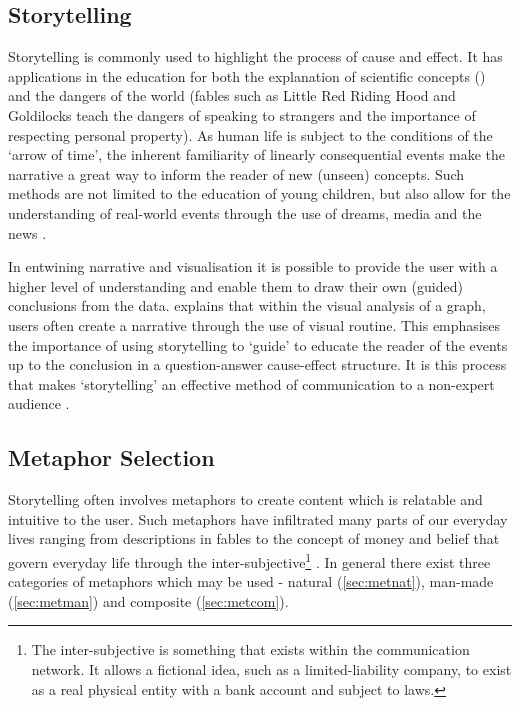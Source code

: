 %



\subsection{Storytelling}\label{sec:storytelling}

Storytelling is commonly used to highlight the process of cause and effect. It has applications in the education for both the explanation of scientific concepts (\citep{marsstory}) and the dangers of the world (fables such as Little Red Riding Hood and Goldilocks teach the dangers of speaking to strangers and the importance of respecting personal property). As human life is subject to the conditions of the `arrow of time', the inherent familiarity of linearly consequential events make the narrative a great way to inform the reader of new (unseen) concepts. Such methods are not limited to the education of young children, but also allow for the understanding of real-world events through the use of dreams, media and the news \citep{storyanimal,dream}.

In entwining narrative and visualisation it is possible to provide the user with a higher level of understanding and enable them to draw their own (guided) conclusions from the data. \cite{eyestory} explains that within the visual analysis of a graph, users often create a narrative through the use of visual routine. This emphasises the importance of using storytelling to `guide' to educate the reader of the events up to the conclusion in a question-answer cause-effect structure. It is this process that makes `storytelling' an effective method of communication to a non-expert audience \citep{nonscientific}.


\subsection{Metaphor Selection}\label{sec:metaphor}
Storytelling often involves metaphors to create content which is relatable and intuitive to the user. Such metaphors have infiltrated many parts of our everyday lives ranging from descriptions in fables to the concept of money and belief that govern everyday life through the inter-subjective\footnote{The inter-subjective is something that exists within the communication network. It allows a fictional idea, such as a limited-liability company, to exist as a real physical entity with a bank account and subject to laws. } \citep{sapiens}. In general there exist three categories of metaphors which may be used - natural (\autoref{sec:metnat}), man-made (\autoref{sec:metman}) and composite (\autoref{sec:metcom}).

